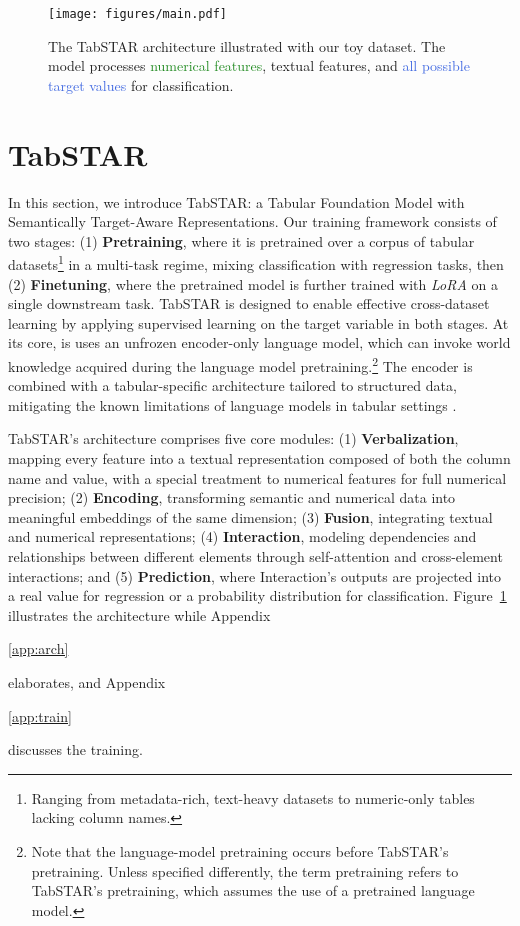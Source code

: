 \documentclass{article}
\newif\ifappendicesincluded
\newcommand{\appref}[1]{%
  \ifappendicesincluded
    \ref{#1}%
  \else
    \ref*{#1}%
  \fi
}
\begin{document}
\begin{figure}[t!]
  \centering
  \texttt{[image: figures/main.pdf]}
  \caption{The TabSTAR architecture illustrated with our toy dataset. The model processes \textcolor{ForestGreen}{numerical features}, \textcolor{BrickRed}{textual features}, and \textcolor{RoyalBlue}{all possible target values} for classification.} 
    \label{fig:architecture}
\end{figure}

\section{TabSTAR}
\label{sec:tabstar}

In this section, we introduce TabSTAR: a Tabular Foundation Model with Semantically Target-Aware Representations. Our training framework consists of two stages: (1) \textbf{Pretraining}, where it is pretrained over a corpus of tabular datasets\footnote{Ranging from metadata-rich, text-heavy datasets to numeric-only tables lacking column names.} in a multi-task regime, mixing classification with regression tasks, then (2) \textbf{Finetuning}, where the pretrained model is further trained with \textit{LoRA} \cite{hu_lora_2021} on a single downstream task. TabSTAR is designed to enable effective cross-dataset learning by applying supervised learning on the target variable in both stages. At its core, is uses an unfrozen encoder-only language model, which can invoke world knowledge acquired during the language model pretraining.\footnote{Note that the language-model pretraining occurs before TabSTAR's pretraining. Unless specified differently, the term pretraining refers to TabSTAR's pretraining, which assumes the use of a pretrained language model.} The encoder is combined with a tabular-specific architecture tailored to structured data, mitigating the known limitations of language models in tabular settings \cite{thawani_representing_2021, van_breugel_position_2024}.

TabSTAR's architecture comprises five core modules: (1) \textbf{Verbalization}, mapping every feature into a textual representation composed of both the column name and value, with a special treatment to numerical features for full numerical precision; (2) \textbf{Encoding}, transforming semantic and numerical data into meaningful embeddings of the same dimension; (3) \textbf{Fusion}, integrating textual and numerical representations; (4) \textbf{Interaction}, modeling dependencies and relationships between different elements through self-attention and cross-element interactions; and (5) \textbf{Prediction}, where Interaction's outputs are projected into a real value for regression or a probability distribution for classification. Figure~\ref{fig:architecture} illustrates the architecture while Appendix~\appref{app:arch} elaborates, and Appendix~\appref{app:train} discusses the training.
\end{document}
